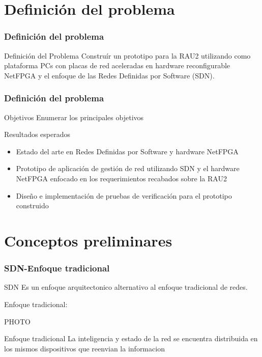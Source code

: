 \documentclass{beamer}
\begin{document}
\section{Definición del problema} 


\begin{frame}
\frametitle{Definición del problema} 

\begin{block}{Definición del Problema }
Constru\'ir un prototipo para la RAU2 utilizando como plataforma PCs con placas de red aceleradas en hardware reconfigurable NetFPGA y el enfoque de las Redes Definidas por Software (SDN).

\end{block}
\end{frame}

\begin{frame}
\frametitle{Definición del problema} 

\begin{block}{Objetivos}
Enumerar los principales objetivos
\end{block}

\begin{block}{Resultados esperados}
\begin{itemize}
\item Estado del arte en Redes Definidas por Software y hardware NetFPGA
\item Prototipo de aplicaci\'on de gesti\'on de red utilizando SDN y el hardware NetFPGA enfocado en los requerimientos recabados sobre la RAU2
\item Diseño e implementaci\'on de pruebas de verificaci\'on para el prototipo construido
\end{itemize}
\end{block}

\end{frame}


\section{Conceptos preliminares} 


\begin{frame}
\frametitle{SDN-Enfoque tradicional} 


SDN Es un enfoque arquitectonico alternativo al enfoque tradicional de redes.

Enfoque tradicional:

PHOTO

\begin{block}{Enfoque tradicional}
La inteligencia y estado de la red se encuentra distribuida en los mismos dispositivos que reenvian la informacion
\end{block}


\end{frame}
\end{document}

